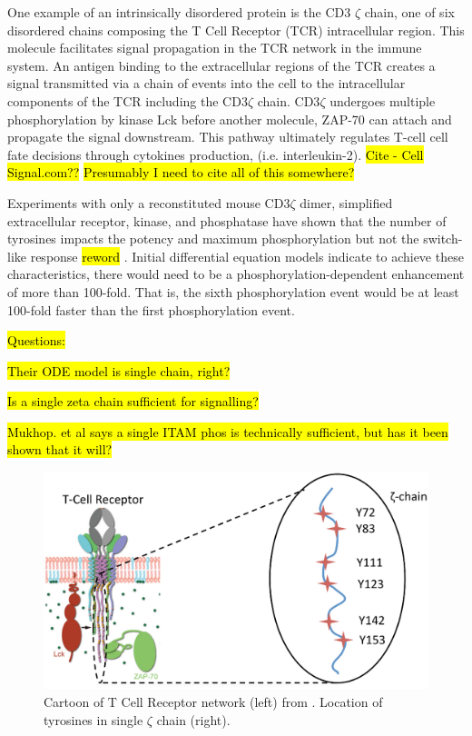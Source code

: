 \documentclass[../AdvancementSummary.tex]{subfiles}
\begin{document}
One example of an intrinsically disordered protein is the CD3 $\zeta$ chain, one of six disordered chains composing the T Cell Receptor (TCR) intracellular region. This molecule facilitates signal propagation in the TCR network in the immune system.  An antigen binding to the extracellular regions of the TCR creates a signal transmitted via a chain of events into the cell to the intracellular components of the TCR including the CD3$\zeta$ chain.  CD3$\zeta$ undergoes multiple phosphorylation by kinase Lck before another molecule, ZAP-70 can attach and propagate the signal downstream. This pathway ultimately regulates T-cell cell fate decisions through cytokines production, (i.e. interleukin-2). \hl{Cite - Cell Signal.com??} \hl{Presumably I need to cite all of this somewhere?}


Experiments with only a reconstituted mouse CD3$\zeta$ dimer, simplified extracellular receptor, kinase, and phosphatase have shown that the number of tyrosines impacts the potency and maximum phosphorylation but not the switch-like response \hl{reword} \cite{Mukhopadhyay2016}. Initial differential equation models indicate to achieve these characteristics, there would need to be a phosphorylation-dependent enhancement of more than 100-fold. That is, the sixth phosphorylation event would be at least 100-fold faster than the first phosphorylation event. \cite{Mukhopadhyay2016} 

\hl{Questions:}

\hl{Their ODE model is single chain, right?}

\hl{Is a single zeta chain sufficient for signalling?} 

\hl{Mukhop. et al says a single ITAM phos is technically sufficient, but has it been shown that it will?}

\begin{figure}
	\begin{center}
		\includegraphics[width=0.8\linewidth]{Figures/TCRDiagram.eps}
	\end{center}
\caption{Cartoon of T Cell Receptor network (left) from \cite{Wu2015}. Location of tyrosines in single $\zeta$ chain (right). \label{fig: TCRCartoon}}
\end{figure}
\end{document}
